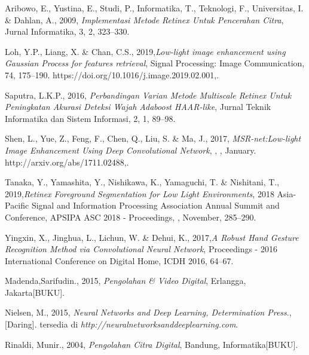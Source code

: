 \documentclass{tesisilkomugm}
\begin{document}
\begin{thebibliography}{99}

Aribowo, E., Yustina, E., Studi, P., Informatika, T., Teknologi, F., Universitas, I. 
\& Dahlan, A., 2009, \emph{Implementasi Metode Retinex Untuk Pencerahan Citra}, 
Jurnal Informatika, 3, 2, 323–330. 

Loh, Y.P., Liang, X. \& Chan, C.S., 2019,\emph{Low-light image enhancement using Gaussian Process for features retrieval}, Signal Processing: Image 
Communication, 74, 175–190. https://doi.org/10.1016/j.image.2019.02.001,. 

Saputra, L.K.P., 2016, \emph{Perbandingan Varian Metode Multiscale Retinex Untuk Peningkatan Akurasi Deteksi Wajah Adaboost HAAR-like}, Jurnal Teknik Informatika dan Sistem Informasi, 2, 1, 89–98.

Shen, L., Yue, Z., Feng, F., Chen, Q., Liu, S. \& Ma, J., 2017, \emph{MSR-net:Low-light 
Image Enhancement Using Deep Convolutional Network}, , , January. 
http://arxiv.org/abs/1711.02488,.

Tanaka, Y., Yamashita, Y., Nishikawa, K., Yamaguchi, T. \& Nishitani, T., 2019,\emph{Retinex Foreground Segmentation for Low Light Environments}, 2018 Asia-Pacific Signal and Information Processing Association Annual Summit and
Conference, APSIPA ASC 2018 - Proceedings, , November, 285–290.

Yingxin, X., Jinghua, L., Lichun, W. \& Dehui, K., 2017,\emph{A Robust Hand Gesture Recognition Method via Convolutional Neural Network}, Proceedings - 2016 
International Conference on Digital Home, ICDH 2016, 64–67. 

Madenda,Sarifudin., 2015, \emph{Pengolahan \& Video Digital}, Erlangga, 
Jakarta[BUKU].

Nielsen, M., 2015, \emph{Neural Networks and Deep Learning, Determination Press}., 
[Daring]. tersedia di \emph{http://neuralnetworksanddeeplearning.com}. 

Rinaldi, Munir., 2004, \emph{Pengolahan Citra Digital}, Bandung, Informatika[BUKU]. 


\end{thebibliography}
\end{document}
